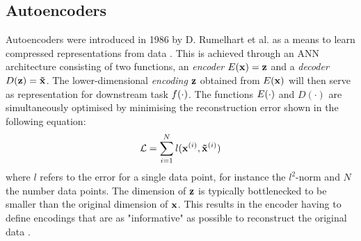 \subsection{Autoencoders}
Autoencoders were introduced in 1986 by D. Rumelhart et al. \cite{rumelhartLearningInternalRepresentations1988} as a means to learn compressed representations from data \cite{bankAutoencoders2021}. This is achieved through an ANN architecture consisting of two functions, an \textit{encoder} $E(\mathbf{x}) = \mathbf{z}$ and a \textit{decoder} $D(\mathbf{z}) = \mathbf{\tilde{x}}$. 
The lower-dimensional \textit{encoding} $\mathbf{z}$ obtained from $E(\mathbf{x})$ will then serve as representation for downstream task $f(\cdot)$.
The functions $E(\cdot)$ and $D(\cdot)$ are simultaneously optimised by minimising the reconstruction error shown in the following equation:
\begin{equation}
	\mathcal{L} = \sum_{i = 1}^N l(\mathbf{x}^{(i)}, \mathbf{\tilde{x}}^{(i)})
\end{equation}
where $l$ refers to the error for a single data point, for instance the $l^2$-norm and $N$ the number data points. The dimension of $\mathbf{z}$ is typically bottlenecked to be smaller than the original dimension of $\mathbf{x}$. This results in the encoder having to define encodings that are as "informative" as possible to reconstruct the original data \cite{bankAutoencoders2021}.

